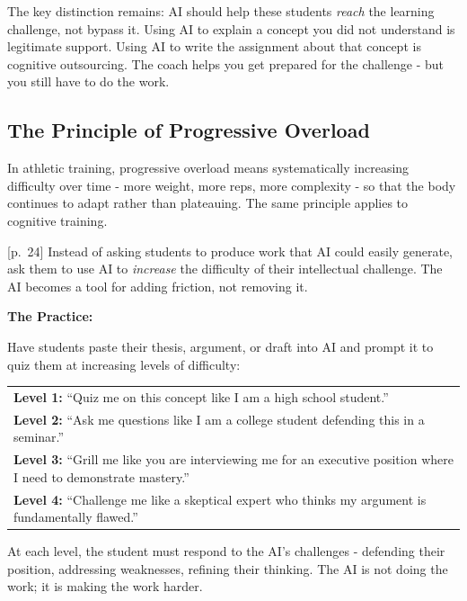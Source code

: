 \documentclass[
  letterpaper,
  DIV=11,
  numbers=noendperiod]{scrreprt}
\newcounter{none} %
\begin{document}
The key distinction remains: AI should help these students \emph{reach}
the learning challenge, not bypass it. Using AI to explain a concept you
did not understand is legitimate support. Using AI to write the
assignment about that concept is cognitive outsourcing. The coach helps
you get prepared for the challenge - but you still have to do the work.

\subsection{The Principle of Progressive
Overload}\label{the-principle-of-progressive-overload}

In athletic training, progressive overload means systematically
increasing difficulty over time - more weight, more reps, more
complexity - so that the body continues to adapt rather than plateauing.
The same principle applies to cognitive training.

{[}p.~24{]} Instead of asking students to produce work that AI could
easily generate, ask them to use AI to \emph{increase} the difficulty of
their intellectual challenge. The AI becomes a tool for adding friction,
not removing it.

\textbf{The Practice:}

Have students paste their thesis, argument, or draft into AI and prompt
it to quiz them at increasing levels of difficulty:

{\def\LTcaptype{none} %
\begin{longtable}[]{@{}
  >{\raggedright\arraybackslash}p{}@{}}
\toprule\noalign{}
\endhead
\bottomrule\noalign{}
\endlastfoot
\textbf{Level 1:} ``Quiz me on this concept like I am a high school
student.'' \\
\textbf{Level 2:} ``Ask me questions like I am a college student
defending this in a seminar.'' \\
\textbf{Level 3:} ``Grill me like you are interviewing me for an
executive position where I need to demonstrate mastery.'' \\
\textbf{Level 4:} ``Challenge me like a skeptical expert who thinks my
argument is fundamentally flawed.'' \\
\end{longtable}
}

At each level, the student must respond to the AI's challenges -
defending their position, addressing weaknesses, refining their
thinking. The AI is not doing the work; it is making the work harder.
\end{document}
